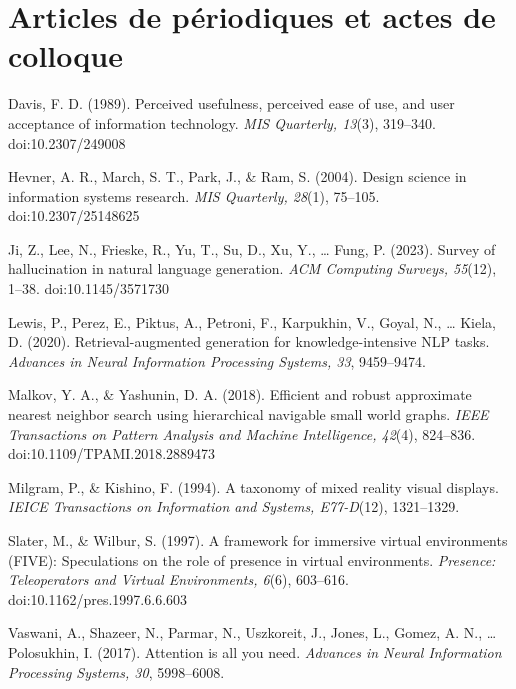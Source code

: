 \section*{Articles de périodiques et actes de colloque}

\begin{apalist}
\item Davis, F. D. (1989). Perceived usefulness, perceived ease of use, and user
      acceptance of information technology. \emph{MIS Quarterly, 13}(3),
      319--340. doi:10.2307/249008

\item Hevner, A. R., March, S. T., Park, J., \& Ram, S. (2004). Design science in
      information systems research. \emph{MIS Quarterly, 28}(1), 75--105.
      doi:10.2307/25148625

\item Ji, Z., Lee, N., Frieske, R., Yu, T., Su, D., Xu, Y., \ldots{} Fung, P.
      (2023). Survey of hallucination in natural language generation.
      \emph{ACM Computing Surveys, 55}(12), 1--38. doi:10.1145/3571730

\item Lewis, P., Perez, E., Piktus, A., Petroni, F., Karpukhin, V., Goyal, N.,
      \ldots{} Kiela, D. (2020). Retrieval-augmented generation for
      knowledge-intensive NLP tasks. \emph{Advances in Neural Information
      Processing Systems, 33}, 9459--9474.

\item Malkov, Y. A., \& Yashunin, D. A. (2018). Efficient and robust approximate
      nearest neighbor search using hierarchical navigable small world graphs.
      \emph{IEEE Transactions on Pattern Analysis and Machine Intelligence,
      42}(4), 824--836. doi:10.1109/TPAMI.2018.2889473

\item Milgram, P., \& Kishino, F. (1994). A taxonomy of mixed reality visual
      displays. \emph{IEICE Transactions on Information and Systems, E77-D}(12),
      1321--1329.

\item Slater, M., \& Wilbur, S. (1997). A framework for immersive virtual
      environments (FIVE): Speculations on the role of presence in virtual
      environments. \emph{Presence: Teleoperators and Virtual Environments,
      6}(6), 603--616. doi:10.1162/pres.1997.6.6.603

\item Vaswani, A., Shazeer, N., Parmar, N., Uszkoreit, J., Jones, L., Gomez,
      A. N., \ldots{} Polosukhin, I. (2017). Attention is all you need.
      \emph{Advances in Neural Information Processing Systems, 30}, 5998--6008.
\end{apalist}

